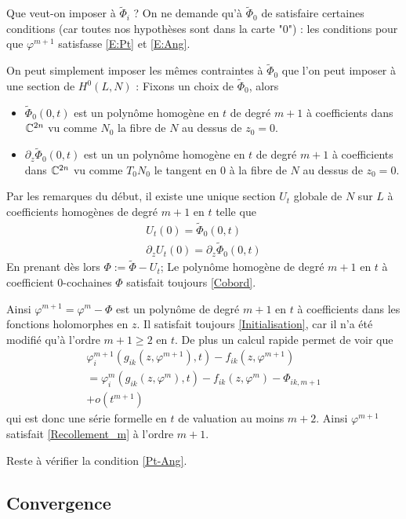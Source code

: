 \documentclass[a4paper,10pt,draft,makeidx,twocolumn]{amsart}
\begin{document}
Que veut-on imposer à $\tilde\Phi_i$ ?
On ne demande qu'à $\tilde\Phi_0$ de satisfaire certaines conditions (car toutes nos hypothèses sont dans la carte "$0$") : les conditions pour que $\varphi^{m+1}$ satisfasse \eqref{E:Pt} et \eqref{E:Ang}.

On peut simplement imposer les mêmes contraintes à $\tilde\Phi_0$ que l'on peut imposer à une section de $H^0(L,N)$ : Fixons un choix de $\tilde\Phi_0$, alors
\begin{itemize}
 \item $\tilde\Phi_0(0,t)$ est un polynôme homogène en $t$ de degré $m+1$ à coefficients dans $\mathbb{C}^{2n}$ vu comme $N_0$ la fibre de $N$ au dessus de $z_0=0$.
\item $\partial_z \tilde\Phi_0(0,t)$ est un un polynôme homogène en $t$ de degré $m+1$ à coefficients dans $\mathbb{C}^{2n}$ vu comme $T_0N_0$ le tangent en $0$ à la fibre de $N$ au dessus de $z_0=0$.
 \end{itemize}
Par les remarques du début, il existe une unique section $U_t$ globale de $N$ sur $L$ à coefficients homogènes de degré $m+1$ en $t$ telle que
\begin{subequations}
\begin{gather}
	U_t(0) = \tilde\Phi_0(0,t)\\
	\partial_z U_t (0) = \partial_z \tilde\Phi_0(0,t)
\end{gather}
\end{subequations}
En prenant dès lors $\Phi := \tilde\Phi - U_t$; Le polynôme homogène de degré $m+1$ en $t$ à coefficient $0$-cochaines $\Phi$ satisfait toujours \eqref{Cobord}.

Ainsi $\varphi^{m+1} = \varphi^m - \Phi$ est un polynôme de degré $m+1$ en $t$ à coefficients dans les fonctions holomorphes en $z$. Il satisfait toujours \eqref{Initialisation}, car il n'a été modifié qu'à l'ordre $m+1 \geq 2$ en $t$.
De plus un calcul rapide permet de voir que
\begin{multline}
\varphi^{m+1}_i(g_{ik}(z,\varphi^{m+1}),t) - f_{ik}(z, \varphi^{m+1}) \\= 
\varphi^{m}_i(g_{ik}(z,\varphi^{m}),t) - f_{ik}(z, \varphi^{m}) - \Phi_{ik,m+1}\\
+o(t^{m+1})
\end{multline}
qui est donc une série formelle en $t$ de valuation au moins $m+2$. Ainsi $\varphi^{m+1}$ satisfait \eqref{Recollement_m} à l'ordre $m+1$.

Reste à vérifier la condition \eqref{Pt-Ang}. 

\subsection{Convergence}
\end{document}
